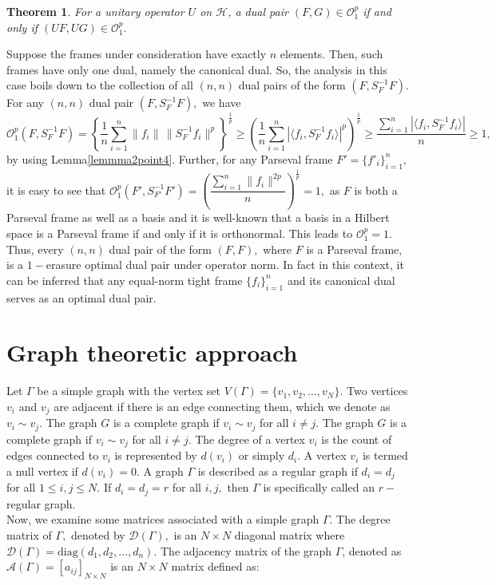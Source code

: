 \documentclass[final,1p,times]{elsarticle}
\newtheorem{thm}{Theorem}[section]
\begin{document}
\begin{thm}\label{thm4point4unitary}
	For a unitary operator $U$ on $\mathcal{H}$, a dual pair $(F,G) \in \mathcal{O}_{1}^p$ if and only if $(UF,UG)  \in \mathcal{O}_{1}^p.$ 
\end{thm}

\par  Suppose the frames under consideration have exactly $n$ elements. Then, such  frames have only one dual, namely the canonical dual. So, the analysis in this case boils down to the collection of all $(n,n)$ dual pairs of the form $(F,S_{F}^{-1}F).$ For any $(n,n)$ dual pair $(F,S_{F}^{-1}F),$ we have  $$\mathcal{O}_{1}^p (F,S_{F}^{-1}F) = \left\{\frac{1}{n} \sum \limits_{i=1}^n\|f_i\|\,\|S_{F}^{-1}f_i  \| ^p\right\}^{\frac{1}{p}} \geq \left(\dfrac{1}{n}\sum \limits_{i=1}^n\left| \langle f_i, S_{F}^{-1}f_i  \rangle\right|^p\right)^{\frac{1}{p}} \geq \dfrac{\sum \limits_{i=1}^n\left| \langle f_i, S_{F}^{-1}f_i  \rangle\right|}{n} \geq 1,$$
by using Lemma\ref{lemmma2point4}. Further, for any Parseval frame $F'=\{f'_i\}_{i=1}^n,$ it is easy to see that $\mathcal{O}_{1}^p (F',S_{F'}^{-1}F') =  \left(\dfrac{\sum \limits_{i=1}^n\|f_i\|^{2p}}{n}\right)^{\frac{1}{p}} =  1 ,$ as  $F$ is both a Parseval frame as well as a basis and it is well-known that  a basis in a Hilbert space is a Parseval frame if and only if it is orthonormal. This leads to $\mathcal{O}_{1}^p  = 1.$ Thus, every $(n,n)$ dual pair of the form $(F,F),$ where $F$ is a Parseval frame, is a $1-$erasure optimal dual pair under operator norm. In fact in this context, it can be inferred that any equal-norm tight frame $\{f_i\}_{i=1}^n$ and its canonical dual serves as an optimal dual pair.


\section{Graph theoretic approach}

Let $\Gamma$ be a simple graph with the vertex set $V(\Gamma)=\{v_1,v_2,…,v_N\}.$ Two vertices $v_i$ and $v_j$ are adjacent if there is an edge connecting them, which we denote as $v_i \sim v_j$. The graph $G$ is a complete graph if  $v_i \sim v_j$ for all $i \neq j.$ The graph $G$ is a complete graph if  $v_i \sim v_j$ for all $i \neq j.$ The degree of a vertex $v_i$ is the count of edges connected to $v_i$ is represented by $d(v_i)$ or simply $d_i$. A vertex $v_i$ is termed a null vertex if $d(v_i)=0.$ A graph $\Gamma$ is described as a regular graph if $d_i=d_j$ for all $1\leq i,j \leq N.$ If $d_i=d_j=r$ for all $i,j,$ then $\Gamma$ is specifically called an $r-$regular graph.\\
Now, we examine some matrices associated with a simple graph $\Gamma.$ The degree matrix of $\Gamma,$ denoted by $\mathcal{D}(\Gamma),$ is an $N \times N$ diagonal matrix where $\mathcal{D}(\Gamma)= \text{diag}(d_1,d_2,\ldots,d_n).$ The adjacency matrix of the graph $\Gamma$, denoted as $\mathcal{A}(\Gamma)=[a_{ij}]_{N \times N}$ is an $N \times N$ matrix defined as:
\end{document}
